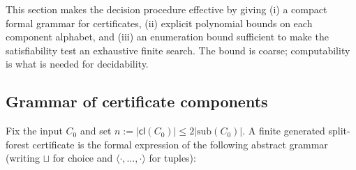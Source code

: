 \documentclass[11pt]{article}
\newcommand{\Cl}{\mathsf{cl}}
\begin{document}
This section makes the decision procedure effective by giving (i) a
compact formal grammar for certificates, (ii) explicit polynomial
bounds on each component alphabet, and (iii) an enumeration bound
sufficient to make the satisfiability test an exhaustive finite
search.  The bound is coarse; computability is what is needed for
decidability.

\subsection{Grammar of certificate components}
\label{ssec:grammar}

Fix the input $C_0$ and set $n:=|\Cl(C_0)|\le 2|\mathrm{sub}(C_0)|$.
A finite generated split-forest certificate is the formal expression
of the following abstract grammar (writing $\sqcup$ for choice and
$\langle\cdot,\dots,\cdot\rangle$ for tuples):
\end{document}
